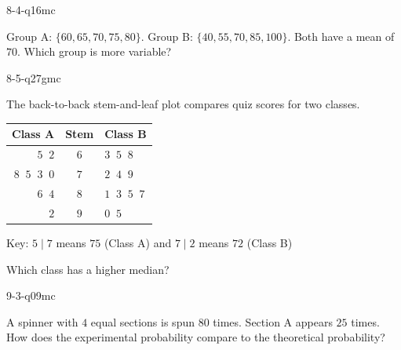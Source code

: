\begin{practiceQuestion}{8-4-q16}{mc}
\begin{questionText}
Group A: $\{60, 65, 70, 75, 80\}$. Group B: $\{40, 55, 70, 85, 100\}$. Both have a mean of $70$. Which group is more variable?
\end{questionText}
\end{practiceQuestion}

\begin{practiceQuestion}{8-5-q27}{gmc}
\begin{questionText}
The back-to-back stem-and-leaf plot compares quiz scores for two classes.

\begin{center}
\begin{tabular}{r|c|l}
\textbf{Class A} & \textbf{Stem} & \textbf{Class B} \\
\hline
$5\;\;2$ & $6$ & $3\;\;5\;\;8$ \\
$8\;\;5\;\;3\;\;0$ & $7$ & $2\;\;4\;\;9$ \\
$6\;\;4$ & $8$ & $1\;\;3\;\;5\;\;7$ \\
$2$ & $9$ & $0\;\;5$
\end{tabular}

Key: $5 \mid 7$ means $75$ (Class A) and $7 \mid 2$ means $72$ (Class B)
\end{center}

Which class has a higher median?
\end{questionText}
\end{practiceQuestion}

\begin{practiceQuestion}{9-3-q09}{mc}
\begin{questionText}
A spinner with $4$ equal sections is spun $80$ times. Section A appears $25$ times. How does the experimental probability compare to the theoretical probability?
\end{questionText}
\end{practiceQuestion}

